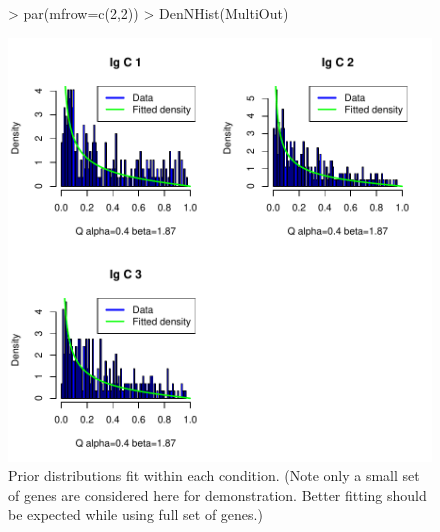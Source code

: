\documentclass{article}
\begin{document}
\begin{figure}[h]
\centering
\begin{Schunk}
\begin{Sinput}
> par(mfrow=c(2,2))
> DenNHist(MultiOut)
\end{Sinput}
\end{Schunk}
\includegraphics{EBSeq_Vignette-041}
\caption{ Prior distributions fit within each condition. 
(Note only a small set of genes are considered here for demonstration.
Better fitting should be expected while using full set of genes.)}
\label{fig:GeneMultiDenNHist}
\end{figure}
\newpage
\clearpage
\newpage
\end{document}
